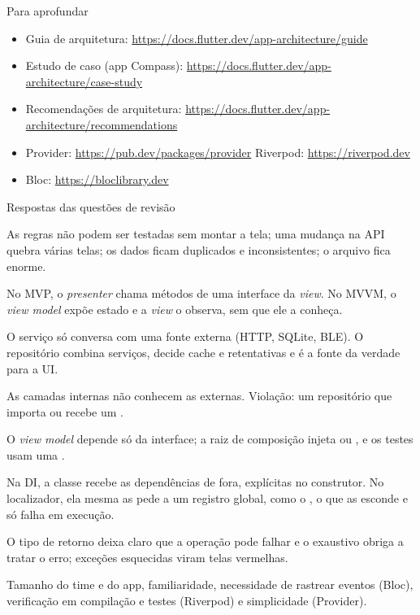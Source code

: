 \documentclass[aspectratio=169,10pt]{beamer}
\begin{document}
\begin{frame}{Para aprofundar}
  \small
  \begin{itemize}
    \item Guia de arquitetura: \url{https://docs.flutter.dev/app-architecture/guide}
    \item Estudo de caso (app Compass): \url{https://docs.flutter.dev/app-architecture/case-study}
    \item Recomendações de arquitetura: \url{https://docs.flutter.dev/app-architecture/recommendations}
    \item Provider: \url{https://pub.dev/packages/provider} \quad Riverpod: \url{https://riverpod.dev}
    \item Bloc: \url{https://bloclibrary.dev}
  \end{itemize}
\end{frame}

\begin{frame}{Respostas das questões de revisão}
  \begin{respostas}
    \item As regras não podem ser testadas sem montar a tela; uma mudança na API quebra várias telas; os dados ficam duplicados e inconsistentes; o arquivo fica enorme.
    \item No MVP, o \emph{presenter} chama métodos de uma interface da \emph{view}. No MVVM, o \emph{view model} expõe estado e a \emph{view} o observa, sem que ele a conheça.
    \item O serviço só conversa com uma fonte externa (HTTP, SQLite, BLE). O repositório combina serviços, decide cache e retentativas e é a fonte da verdade para a UI.
    \item As camadas internas não conhecem as externas. Violação: um repositório que importa  ou recebe um .
    \item O \emph{view model} depende só da interface; a raiz de composição injeta  ou , e os testes usam uma .
    \item Na DI, a classe recebe as dependências de fora, explícitas no construtor. No localizador, ela mesma as pede a um registro global, como o , o que as esconde e só falha em execução.
    \item O tipo de retorno deixa claro que a operação pode falhar e o  exaustivo obriga a tratar o erro; exceções esquecidas viram telas vermelhas.
    \item Tamanho do time e do app, familiaridade, necessidade de rastrear eventos (Bloc), verificação em compilação e testes (Riverpod) e simplicidade (Provider).
  \end{respostas}
\end{frame}

\end{document}
